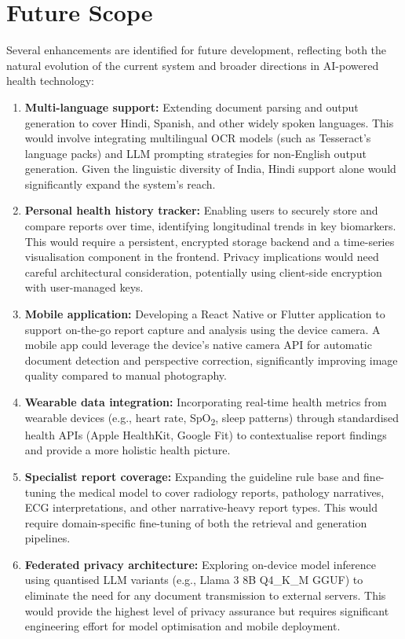 \section{Future Scope}
Several enhancements are identified for future development, reflecting both the natural evolution of the current system and broader directions in AI-powered health technology:

\begin{enumerate}
    \item \textbf{Multi-language support:} Extending document parsing and output generation to cover Hindi, Spanish, and other widely spoken languages. This would involve integrating multilingual OCR models (such as Tesseract's language packs) and LLM prompting strategies for non-English output generation. Given the linguistic diversity of India, Hindi support alone would significantly expand the system's reach.
    \item \textbf{Personal health history tracker:} Enabling users to securely store and compare reports over time, identifying longitudinal trends in key biomarkers. This would require a persistent, encrypted storage backend and a time-series visualisation component in the frontend. Privacy implications would need careful architectural consideration, potentially using client-side encryption with user-managed keys.
    \item \textbf{Mobile application:} Developing a React Native or Flutter application to support on-the-go report capture and analysis using the device camera. A mobile app could leverage the device's native camera API for automatic document detection and perspective correction, significantly improving image quality compared to manual photography.
    \item \textbf{Wearable data integration:} Incorporating real-time health metrics from wearable devices (e.g., heart rate, SpO\textsubscript{2}, sleep patterns) through standardised health APIs (Apple HealthKit, Google Fit) to contextualise report findings and provide a more holistic health picture.
    \item \textbf{Specialist report coverage:} Expanding the guideline rule base and fine-tuning the medical model to cover radiology reports, pathology narratives, ECG interpretations, and other narrative-heavy report types. This would require domain-specific fine-tuning of both the retrieval and generation pipelines.
    \item \textbf{Federated privacy architecture:} Exploring on-device model inference using quantised LLM variants (e.g., Llama 3 8B Q4\_K\_M GGUF) to eliminate the need for any document transmission to external servers. This would provide the highest level of privacy assurance but requires significant engineering effort for model optimisation and mobile deployment.

\end{enumerate}
